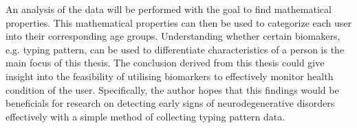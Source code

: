 An analysis of the data will be performed with the goal to find mathematical properties.
This mathematical properties can then be used to categorize each user into their corresponding age groups.
Understanding whether certain biomakers, e.g. typing pattern, can be used to differentiate characteristics of a person is the main focus of this thesis.
The conclusion derived from this thesis could give insight into the feasibility of utilising biomarkers to effectively monitor health condition of the user.
Specifically, the author hopes that this findings would be beneficials for research on detecting early signs of neurodegenerative disorders effectively with a simple method of collecting typing pattern data.

